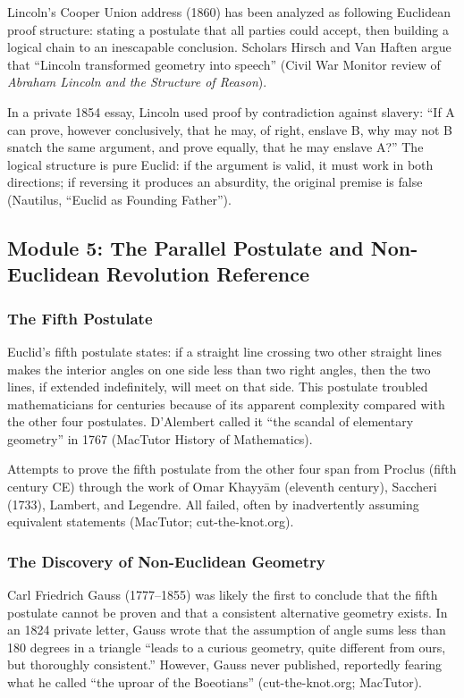 \documentclass[11pt,letterpaper]{article}
\begin{document}
Lincoln's Cooper Union address (1860) has been analyzed as following Euclidean proof structure: stating a postulate that all parties could accept, then building a logical chain to an inescapable conclusion. Scholars Hirsch and Van Haften argue that ``Lincoln transformed geometry into speech'' (Civil War Monitor review of \textit{Abraham Lincoln and the Structure of Reason}).

In a private 1854 essay, Lincoln used proof by contradiction against slavery: ``If A can prove, however conclusively, that he may, of right, enslave B, why may not B snatch the same argument, and prove equally, that he may enslave A?'' The logical structure is pure Euclid: if the argument is valid, it must work in both directions; if reversing it produces an absurdity, the original premise is false (Nautilus, ``Euclid as Founding Father'').

\subsection{Module 5: The Parallel Postulate and Non-Euclidean Revolution Reference}

\subsubsection{The Fifth Postulate}

Euclid's fifth postulate states: if a straight line crossing two other straight lines makes the interior angles on one side less than two right angles, then the two lines, if extended indefinitely, will meet on that side. This postulate troubled mathematicians for centuries because of its apparent complexity compared with the other four postulates. D'Alembert called it ``the scandal of elementary geometry'' in 1767 (MacTutor History of Mathematics).

Attempts to prove the fifth postulate from the other four span from Proclus (fifth century CE) through the work of Omar Khayy\={a}m (eleventh century), Saccheri (1733), Lambert, and Legendre. All failed, often by inadvertently assuming equivalent statements (MacTutor; cut-the-knot.org).

\subsubsection{The Discovery of Non-Euclidean Geometry}

Carl Friedrich Gauss (1777--1855) was likely the first to conclude that the fifth postulate cannot be proven and that a consistent alternative geometry exists. In an 1824 private letter, Gauss wrote that the assumption of angle sums less than 180 degrees in a triangle ``leads to a curious geometry, quite different from ours, but thoroughly consistent.'' However, Gauss never published, reportedly fearing what he called ``the uproar of the Boeotians'' (cut-the-knot.org; MacTutor).
\end{document}
